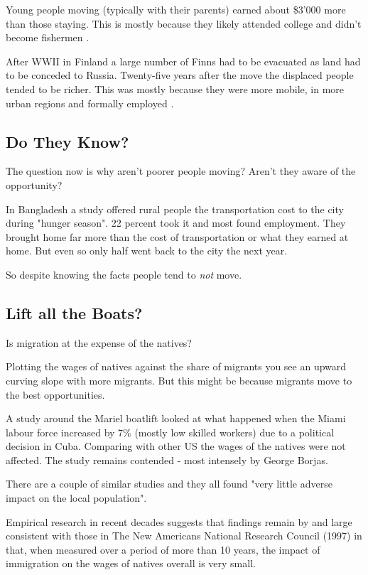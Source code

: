 \documentclass[a4paper, twocolumn]{article}
\begin{document}
Young people moving (typically with their parents) earned about \$3'000 more than those staying. This is mostly because they likely attended college and didn't become fishermen \cite{iceland-volcano}.

After WWII in Finland a large number of Finns had to be evacuated as land had to be conceded to Russia. Twenty-five years after the move the displaced people tended to be richer. This was mostly because they were more mobile, in more urban regions and formally employed \cite{finland-ww2}.

\subsection{Do They Know?}
The question now is why aren't poorer people moving? Aren't they aware of the opportunity?

In Bangladesh a study \cite{monga-migration} offered rural people the transportation cost to the city during "hunger season". 22 percent took it and most found employment. They brought home far more than the cost of transportation or what they earned at home. But even so only half went back to the city the next year.

So despite knowing the facts people tend to \emph{not} move.

\subsection{Lift all the Boats?}
Is migration at the expense of the natives?

Plotting the wages of natives against the share of migrants you see an upward curving slope with more migrants. But this might be because migrants move to the best opportunities.

A study \cite{mariel-boatlift} around the Mariel boatlift looked at what happened when the Miami labour force increased by 7\% (mostly low skilled workers) due to a political decision in Cuba. Comparing with other US the wages of the natives were not affected. The study remains contended - most intensely by George Borjas.

There are a couple of similar studies and they all found "very little adverse impact on the local population".

\begin{mdframed}[style=mystyle,frametitle=US National Academy of Sciences]
Empirical research in recent decades suggests that findings remain by and large consistent with those in The New Americans National Research Council (1997) in that, when measured over a period of more than 10 years, the impact of immigration on the wages of natives overall is very small. \cite{immigration-consequences}
\end{mdframed}
\end{document}
